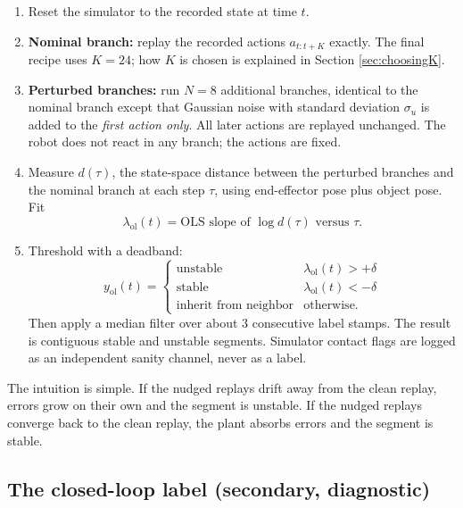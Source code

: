 \documentclass[11pt]{article}
\begin{document}
\begin{enumerate}[leftmargin=2em]
  \item Reset the simulator to the recorded state at time $t$.
  \item \textbf{Nominal branch:} replay the recorded actions $a_{t:t+K}$ exactly. The
        final recipe uses $K = 24$; how $K$ is chosen is explained in Section
        \ref{sec:choosingK}.
  \item \textbf{Perturbed branches:} run $N = 8$ additional branches, identical to the
        nominal branch except that Gaussian noise with standard deviation $\sigma_u$ is
        added to the \emph{first action only}. All later actions are replayed unchanged.
        The robot does not react in any branch; the actions are fixed.
  \item Measure $d(\tau)$, the state-space distance between the perturbed branches and
        the nominal branch at each step $\tau$, using end-effector pose plus object
        pose. Fit
        \begin{equation}
        \lambda_{\mathrm{ol}}(t) = \text{OLS slope of } \log d(\tau) \text{ versus } \tau.
        \end{equation}
  \item Threshold with a deadband:
        \begin{equation}
        y_{\mathrm{ol}}(t) =
        \begin{cases}
        \text{unstable} & \lambda_{\mathrm{ol}}(t) > +\delta \\
        \text{stable} & \lambda_{\mathrm{ol}}(t) < -\delta \\
        \text{inherit from neighbor} & \text{otherwise.}
        \end{cases}
        \end{equation}
        Then apply a median filter over about 3 consecutive label stamps. The result is
        contiguous stable and unstable segments. Simulator contact flags are logged as
        an independent sanity channel, never as a label.
\end{enumerate}

The intuition is simple. If the nudged replays drift away from the clean replay, errors
grow on their own and the segment is unstable. If the nudged replays converge back to
the clean replay, the plant absorbs errors and the segment is stable.

\subsection{The closed-loop label (secondary, diagnostic)}
\end{document}
